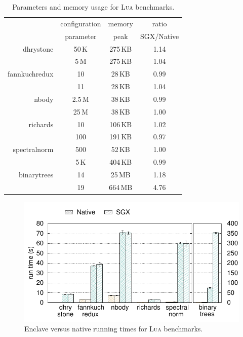 \newcommand{\higparamcolor}{\rowcolor[rgb]{0.79,0.91,0.90}\cellcolor{white}}
\newcommand{\lowparamcolor}{\rowcolor[rgb]{0.94,0.88,0.76}\cellcolor{white}}
\begin{table}[t!]
    \centering
    \begin{tabular}{r|c|c|c}
                       &configuration &memory      &ratio \\
                       &parameter     &peak        &SGX/Native \\
\hline
\lowparamcolor
\textsf{dhrystone}     &50\,K      &275\,KB       & 1.14 \\
\higparamcolor
                       &5\,M       &275\,KB       & 1.04 \\
\hline
\lowparamcolor
\textsf{fannkuchredux} &10         &28\,KB        & 0.99 \\
\higparamcolor
                       &11         &28\,KB        & 1.04 \\
\hline
\lowparamcolor
\textsf{nbody}         &2.5\,M     &38\,KB        & 0.99 \\
\higparamcolor
                       &25\,M      &38\,KB        & 1.00 \\
\hline
\lowparamcolor
\textsf{richards}      &10         &106\,KB       & 1.02 \\
\higparamcolor
                       &100        &191\,KB       & 0.97 \\
\hline
\lowparamcolor
\textsf{spectralnorm}  &500        &52\,KB        & 1.00 \\
\higparamcolor
                       &5\,K       &404\,KB       & 0.99 \\
\hline
\lowparamcolor
\textsf{binarytrees}   &14         &25\,MB        & 1.18 \\
\higparamcolor
                       &19         &664\,MB       & 4.76 \\
    \end{tabular}
    \caption{Parameters and memory usage for \textsc{Lua} benchmarks.}
  \label{tab:luabmarks}
\end{table}

\begin{figure}[t!]
  \centering
  \includegraphics[width=\linewidth]{plots/microbenchmark_luasgx/microbenchmark_luasgx}
  \caption{Enclave versus native running times for \textsc{Lua} benchmarks.}
  \label{fig:luabenchs}
\end{figure}

